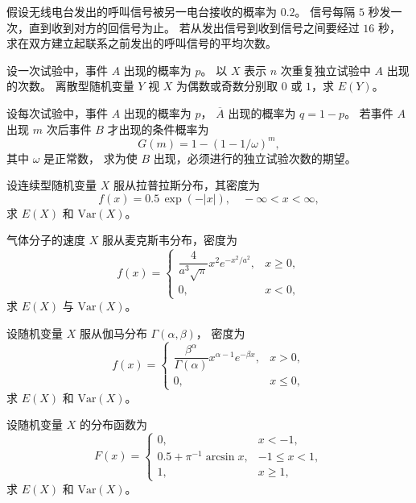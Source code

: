 \begin{homework}[3.8]
假设无线电台发出的呼叫信号被另一电台接收的概率为 $0.2$。
信号每隔 $5$ 秒发一次，直到收到对方的回信号为止。
若从发出信号到收到信号之间要经过 $16$ 秒，
求在双方建立起联系之前发出的呼叫信号的平均次数。
\end{homework}

\begin{homework}[3.9]
设一次试验中，事件 $A$ 出现的概率为 $p$。
以 $X$ 表示 $n$ 次重复独立试验中 $A$ 出现的次数。
离散型随机变量 $Y$ 视 $X$ 为偶数或奇数分别取 $0$ 或 $1$，求 $E(Y)$。
\end{homework}

\begin{homework}[3.10]
设每次试验中，事件 $A$ 出现的概率为 $p$，
$\overline{A}$ 出现的概率为 $q=1-p$。
若事件 $A$ 出现 $m$ 次后事件 $B$ 才出现的条件概率为
\[
G(m)=1-(1-1/\omega)^m,
\]
其中 $\omega$ 是正常数，
求为使 $B$ 出现，必须进行的独立试验次数的期望。
\end{homework}

\begin{homework}[3.11]
设连续型随机变量 $X$ 服从拉普拉斯分布，其密度为
\[
f(x)=0.5\,\exp(-|x|),\quad -\infty<x<\infty,
\]
求 $E(X)$ 和 $\mathrm{Var}(X)$。
\end{homework}

\begin{homework}[3.12]
气体分子的速度 $X$ 服从麦克斯韦分布，密度为
\[
f(x)=
\begin{cases}
\dfrac{4}{a^3\sqrt{\pi}}x^2 e^{-x^2/a^2}, & x\ge0,\\
0,& x<0,
\end{cases}
\]
求 $E(X)$ 与 $\mathrm{Var}(X)$。
\end{homework}

\begin{homework}[3.13]
设随机变量 $X$ 服从伽马分布 $\Gamma(\alpha,\beta)$，
密度为
\[
f(x)=
\begin{cases}
\dfrac{\beta^\alpha}{\Gamma(\alpha)}x^{\alpha-1}e^{-\beta x}, & x>0,\\[4pt]
0, & x\le0,
\end{cases}
\]
求 $E(X)$ 和 $\mathrm{Var}(X)$。
\end{homework}

\begin{homework}[3.14]
设随机变量 $X$ 的分布函数为
\[
F(x)=
\begin{cases}
0,& x<-1,\\
0.5+\pi^{-1}\arcsin x,& -1\le x<1,\\
1,& x\ge1,
\end{cases}
\]
求 $E(X)$ 和 $\mathrm{Var}(X)$。
\end{homework}

